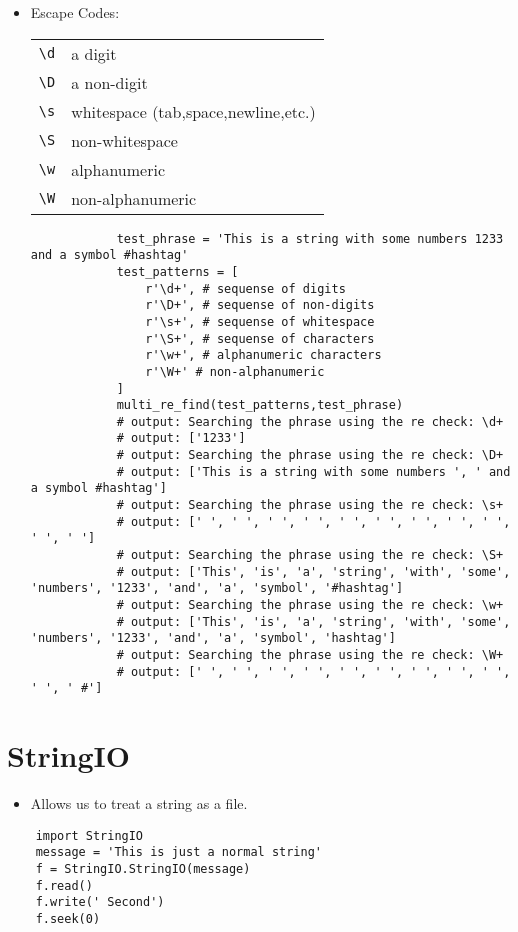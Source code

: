 \begin{itemize}
    \item Escape Codes: 
        \begin{center}
            \begin{tabular}{ |p{5cm}|p{8cm}| }
                \hline
                    \verb|\d| & a digit \\
                    \verb|\D| & a non-digit \\
                    \verb|\s| & whitespace (tab,space,newline,etc.) \\
                    \verb|\S| & non-whitespace \\
                    \verb|\w| & alphanumeric \\
                    \verb|\W| & non-alphanumeric \\
                \hline
            \end{tabular}
        \end{center}
        \begin{verbatim}
            test_phrase = 'This is a string with some numbers 1233 and a symbol #hashtag'
            test_patterns = [
                r'\d+', # sequense of digits
                r'\D+', # sequense of non-digits
                r'\s+', # sequense of whitespace
                r'\S+', # sequense of characters
                r'\w+', # alphanumeric characters
                r'\W+' # non-alphanumeric
            ]
            multi_re_find(test_patterns,test_phrase)
            # output: Searching the phrase using the re check: \d+
            # output: ['1233']
            # output: Searching the phrase using the re check: \D+
            # output: ['This is a string with some numbers ', ' and a symbol #hashtag']
            # output: Searching the phrase using the re check: \s+
            # output: [' ', ' ', ' ', ' ', ' ', ' ', ' ', ' ', ' ', ' ', ' ']
            # output: Searching the phrase using the re check: \S+
            # output: ['This', 'is', 'a', 'string', 'with', 'some', 'numbers', '1233', 'and', 'a', 'symbol', '#hashtag']
            # output: Searching the phrase using the re check: \w+
            # output: ['This', 'is', 'a', 'string', 'with', 'some', 'numbers', '1233', 'and', 'a', 'symbol', 'hashtag']
            # output: Searching the phrase using the re check: \W+
            # output: [' ', ' ', ' ', ' ', ' ', ' ', ' ', ' ', ' ', ' ', ' #']
        \end{verbatim}
\end{itemize}


\section{StringIO}
\begin{itemize}
    \item Allows us to treat a string as a file. 
\end{itemize}
\begin{verbatim}
    import StringIO
    message = 'This is just a normal string'
    f = StringIO.StringIO(message)
    f.read()
    f.write(' Second')
    f.seek(0)
\end{verbatim}
